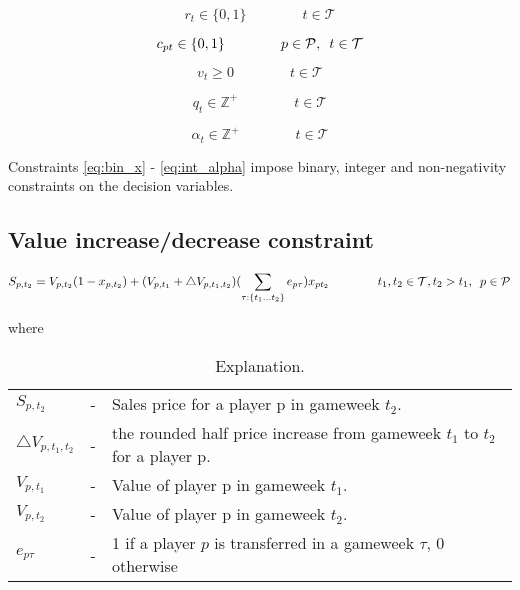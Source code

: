 \begin{equation} \label{eq:free_hit_bin_r}
    r_{t} \in \{0,1\} \qquad\qquad  t \in \mathcal{T}
\end{equation}

\begin{equation} \label{eq:triple_captain_bin_c}
    c_{pt} \in \{0,1\} \qquad\qquad p \in \mathcal{P}, \enskip t \in \mathcal{T} 
\end{equation}

\begin{equation} \label{eq:nonn_v}
    v_{t} \geq 0 \qquad\qquad t \in \mathcal{T} 
\end{equation}

\begin{equation} \label{eq:int_q}
    q_{t} \in \mathbb{Z}^{+}  \qquad\qquad t \in \mathcal{T}
\end{equation}

\begin{equation} \label{eq:int_alpha}
    \alpha_{t} \in \mathbb{Z}^{+}  \qquad\qquad t \in \mathcal{T}
\end{equation}

Constraints \eqref{eq:bin_x} - \eqref{eq:int_alpha} impose binary, integer and non-negativity constraints on the decision variables.

\newpage

\subsection{Value increase/decrease constraint}

\begin{equation*}
    S_{p,t_{2}} = V_{p,t_{2}}(1-x_{p,t_{2}}) + (V_{p,t_{1}} + \triangle V_{p,t_{1},t_{2}}) (\sum_{\tau:\{ t_{1} \dots t_{2}\}} e_{p\tau}) x_{pt_{2}} \qquad\qquad t_{1}, t_{2} \in \mathcal{T}, t_{2} > t_{1}, \enskip p \in \mathcal{P}
\end{equation*}

where 


\begin{table}[H]
\centering
\caption{Explanation.}
\begin{tabular}{@{}lll@{}}
\toprule
$S_{p,t_{2}}$ & - & Sales price for a player p in gameweek $t_{2}$.\\
$\triangle V_{p,t_{1},t_{2}}$  & - & the rounded half price increase from gameweek $t_{1}$ to $t_{2}$ for a player p. \\ 
$V_{p,t_{1}}$   & - & Value of player p in gameweek $t_{1}$.                                             \\
$V_{p,t_{2}}$   & - & Value of player p in gameweek $t_{2}$.                                             \\
$e_{p\tau}$     & - & 1 if a player $p$ is transferred in a gameweek $\tau$, 0 otherwise                  \\
\bottomrule
\end{tabular}
\end{table}

